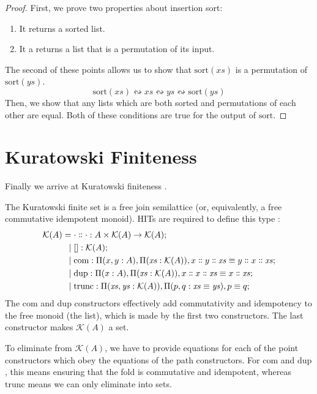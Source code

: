 \begin{proof}
  First, we prove two properties about insertion sort:
  \begin{enumerate}
    \item It returns a sorted list.
    \item It a returns a list that is a permutation of its input.
  \end{enumerate}
  The second of these points allows us to show that \(\text{sort}(\mathit{xs})\)
  is a permutation of \(\text{sort}(\mathit{ys})\).
  \begin{equation}
    \text{sort}(\mathit{xs}) \leftrightsquigarrow \mathit{xs} \leftrightsquigarrow \mathit{ys} \leftrightsquigarrow \text{sort}(\mathit{ys})
  \end{equation}
  Then, we show that any lists which are both sorted and permutations of each
  other are equal.
  Both of these conditions are true for the output of \(\text{sort}\).
\end{proof}
\section{Kuratowski Finiteness} \label{kuratowski}
Finally we arrive at Kuratowski finiteness
\cite{kuratowskiNotionEnsembleFini1920}.
\begin{rm-definition}
  The Kuratowski finite set is a free join semilattice (or, equivalently, a free
  commutative idempotent monoid).
  HITs are required to define this type
  \cite{altenkirchDefinableQuotientsType2011}:
  \begin{equation}
    \begin{aligned}
      \mathcal{K}(A) =&
       \; \cdot \dblcolon \cdot : A \times \mathcal{K}(A) \rightarrow \mathcal{K}(A) ; \\
      \vert& \; [] : \mathcal{K}(A) ; \\
      \vert& \; \text{com} : \Pi (x, y: A) , \Pi (\mathit{xs}: \mathcal{K}(A)) , x \dblcolon y \dblcolon \mathit{xs} \equiv y \dblcolon x \dblcolon \mathit{xs} ; \\
      \vert& \; \text{dup} : \Pi (\mathit{x}: A) , \Pi (\mathit{xs}: \mathcal{K}(A)) , x \dblcolon x \dblcolon \mathit{xs} \equiv x \dblcolon \mathit{xs} ; \\
      \vert& \; \text{trunc} : \Pi (\mathit{xs}, \mathit{ys}: \mathcal{K}(A)) , \Pi (p, q : \mathit{xs} \equiv \mathit{ys}) , p \equiv q ;
    \end{aligned}
  \end{equation}
  The \(\text{com}\) and \(\text{dup}\) constructors effectively add
  commutativity and idempotency to the free monoid (the list), which is made by
  the first two constructors.
  The last constructor makes \(\mathcal{K}(A)\) a set.

  To eliminate from \(\mathcal{K}(A)\), we have to provide equations for each of
  the point constructors which obey the equations of the path constructors.
  For \(\text{com}\) and \(\text{dup}\), this means ensuring that the fold is
  commutative and idempotent, whereas \(\text{trunc}\) means we can only
  eliminate into sets.
\end{rm-definition}

